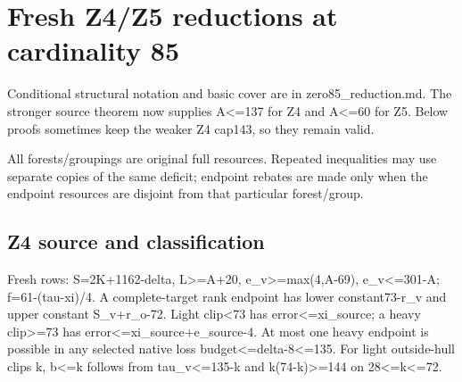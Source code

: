 \documentclass[10pt,a4paper]{article}
\theoremstyle{definition}
\begin{document}
\clearpage
\hypertarget{fresh-z4z5-reductions-at-cardinality-85}{%
\section{Fresh Z4/Z5 reductions at cardinality
85}\label{fresh-z4z5-reductions-at-cardinality-85}}

Conditional structural notation and basic cover are in
zero85\_\allowbreak{}reduction.md. The stronger source theorem now supplies
A\textless=\allowbreak{}137 for Z4 and A\textless=\allowbreak{}60 for Z5. Below proofs sometimes
keep the weaker Z4 cap143,\allowbreak{} so they remain valid.

All forests/groupings are original full resources. Repeated inequalities
may use separate copies of the same deficit; endpoint rebates are made
only when the endpoint resources are disjoint from that particular
forest/group.

\hypertarget{z4-source-and-classification}{%
\subsection{Z4 source and
classification}\label{z4-source-and-classification}}

Fresh rows: S=\allowbreak{}2K+\allowbreak{}1162-delta,\allowbreak{} L\textgreater=\allowbreak{}A+\allowbreak{}20,\allowbreak{}
e\_\allowbreak{}v\textgreater=\allowbreak{}max(4,\allowbreak{}A-69),\allowbreak{} e\_\allowbreak{}v\textless=\allowbreak{}301-A; f=\allowbreak{}61-(tau-xi)/4. A
complete-target rank endpoint has lower constant73-r\_\allowbreak{}v and upper
constant S\_\allowbreak{}v+\allowbreak{}r\_\allowbreak{}o-72. Light clip\textless73 has
error\textless=\allowbreak{}xi\_\allowbreak{}source; a heavy clip\textgreater=\allowbreak{}73 has
error\textless=\allowbreak{}xi\_\allowbreak{}source+\allowbreak{}e\_\allowbreak{}source-4. At most one heavy endpoint is
possible in any selected native loss
budget\textless=\allowbreak{}delta-8\textless=\allowbreak{}135. For light outside-hull clips k,\allowbreak{}
b\textless=\allowbreak{}k follows from tau\_\allowbreak{}v\textless=\allowbreak{}135-k and
k(74-k)\textgreater=\allowbreak{}144 on 28\textless=\allowbreak{}k\textless=\allowbreak{}72.
\end{document}
